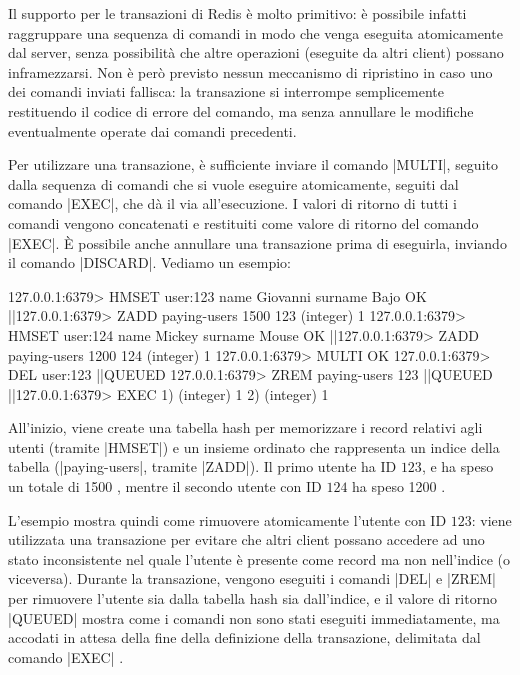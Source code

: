 Il supporto per le transazioni di Redis è molto primitivo: è possibile infatti raggruppare
una sequenza di comandi in modo che venga eseguita atomicamente dal server, senza possibilità che
altre operazioni (eseguite da altri client) possano inframezzarsi. Non è però previsto nessun
meccanismo di ripristino in caso uno dei comandi inviati fallisca: la transazione si interrompe
semplicemente restituendo il codice di errore del comando, ma senza annullare le modifiche
eventualmente operate dai comandi precedenti.

Per utilizzare una transazione, è sufficiente inviare il comando \cverb|MULTI|, seguito dalla 
sequenza di comandi che si vuole eseguire atomicamente, seguiti dal comando \cverb|EXEC|, che dà
il via all'esecuzione. I valori di ritorno di tutti i comandi vengono concatenati e restituiti come
valore di ritorno del comando \cverb|EXEC|. È possibile anche annullare una transazione prima di
eseguirla, inviando il comando \cverb|DISCARD|. Vediamo un esempio:

\begin{commentedsource}[style=redis]
127.0.0.1:6379> HMSET user:123 name Giovanni surname Bajo
OK
|\lnote|127.0.0.1:6379> ZADD paying-users 1500 123
(integer) 1
127.0.0.1:6379> HMSET user:124 name Mickey surname Mouse
OK
|\lnote|127.0.0.1:6379> ZADD paying-users 1200 124
(integer) 1
127.0.0.1:6379> MULTI
OK
127.0.0.1:6379> DEL user:123
|\lnote|QUEUED
127.0.0.1:6379> ZREM paying-users 123
|\lnote|QUEUED
|\lnote|127.0.0.1:6379> EXEC
1) (integer) 1
2) (integer) 1
\end{commentedsource}

All'inizio, viene create una tabella hash per memorizzare i record relativi agli utenti (tramite
\cverb|HMSET|) e un insieme ordinato che rappresenta un indice della tabella (\cverb|paying-users|,
tramite \cverb|ZADD|). Il primo utente ha ID $123$, e ha speso un totale di \SI{1500}{\EUR}
, mentre il secondo utente con ID $124$ ha speso \SI{1200}{\EUR} .

L'esempio mostra quindi come rimuovere atomicamente l'utente con ID $123$: viene utilizzata una
transazione per evitare che altri client possano accedere ad uno stato inconsistente nel quale
l'utente è presente come record ma non nell'indice (o viceversa). Durante la transazione,
vengono eseguiti i comandi \cverb|DEL| e \cverb|ZREM| per rimuovere l'utente sia dalla tabella
hash sia dall'indice, e il valore di ritorno \cverb|QUEUED|   mostra come
i comandi non sono stati eseguiti immediatamente, ma accodati in attesa della fine della 
definizione della transazione, delimitata dal comando \cverb|EXEC| .

